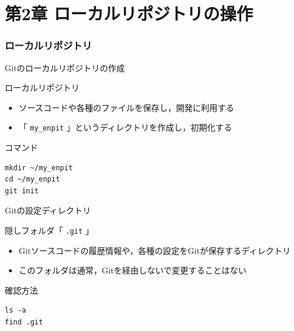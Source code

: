 \documentclass[t, aspectratio=169]{beamer}
\begin{document}
\part{第2章 ローカルリポジトリの操作}
\label{sec-2}
\section{ローカルリポジトリ}
\label{sec-2-1}
\begin{frame}[fragile,label=sec-2-1-1]{Gitのローカルリポジトリの作成}
 \begin{block}{ローカルリポジトリ}
\begin{itemize}
\item ソースコードや各種のファイルを保存し，開発に利用する
\item 「 \texttt{my\_enpit} 」というディレクトリを作成し，初期化する
\end{itemize}
\end{block}
\begin{block}{コマンド}
\begin{verbatim}
mkdir ~/my_enpit
cd ~/my_enpit
git init
\end{verbatim}
\end{block}
\end{frame}

\begin{frame}[fragile,label=sec-2-1-2]{Gitの設定ディレクトリ}
 \begin{block}{隠しフォルダ「 \texttt{.git} 」}
\begin{itemize}
\item Gitソースコードの履歴情報や，各種の設定をGitが保存するディレクトリ
\item このフォルダは通常，Gitを経由しないで変更することはない
\end{itemize}
\end{block}
\begin{block}{確認方法}
\begin{verbatim}
ls -a
find .git
\end{verbatim}
\end{block}
\end{frame}
\end{document}

